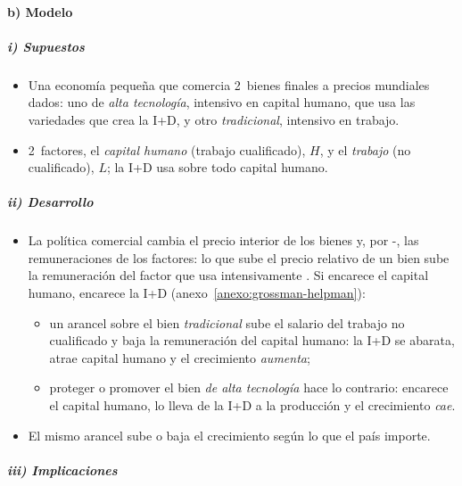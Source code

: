 \documentclass[11pt]{article}
\begin{document}
\paragraph{b) Modelo}

\subparagraph{i) Supuestos}

\begin{itemize}
\item Una economía pequeña que comercia 2~bienes finales a precios mundiales dados\nocite{GrossmanHelpman1991Small}: uno de \emph{alta tecnología}, intensivo en capital humano, que usa las variedades que crea la I+D, y otro \emph{tradicional}, intensivo en trabajo.
\item 2~factores, el \emph{capital humano} (trabajo cualificado), $H$, y el \emph{trabajo} (no cualificado), $L$; la I+D usa sobre todo capital humano.
\end{itemize}

\subparagraph{ii) Desarrollo}

\begin{itemize}
\item La política comercial cambia el precio interior de los bienes y, por -, las remuneraciones de los factores: lo que sube el precio relativo de un bien sube la remuneración del factor que usa intensivamente . Si encarece el capital humano, encarece la I+D (anexo~\ref{anexo:grossman-helpman}):
  \begin{itemize}
  \item un arancel sobre el bien \emph{tradicional} sube el salario del trabajo no cualificado y baja la remuneración del capital humano: la I+D se abarata, atrae capital humano y el crecimiento \emph{aumenta};
  \item proteger o promover el bien \emph{de alta tecnología} hace lo contrario: encarece el capital humano, lo lleva de la I+D a la producción y el crecimiento \emph{cae}.
  \end{itemize}
\item El mismo arancel sube o baja el crecimiento según lo que el país importe.
\end{itemize}

\subparagraph{iii) Implicaciones}
\end{document}
